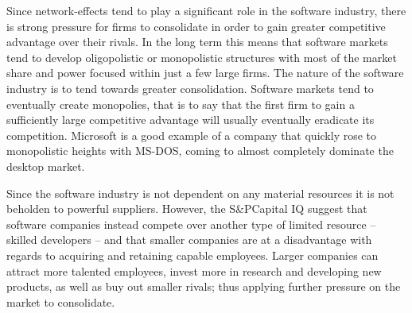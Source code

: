 Since network-effects tend to play a significant role in the software industry, there is strong pressure for firms to consolidate in order to gain greater competitive advantage over their rivals.\autocite[422]{schief2013mergers}
In the long term this means that software markets tend to develop oligopolistic or monopolistic structures with most of the market share and power focused within just a few large firms.\autocite[422]{schief2013mergers}
The nature of the software industry is to tend towards greater consolidation.\autocite[]{LargeParadigmShiftCloudComputing}
Software markets tend to eventually create monopolies, that is to say that the first firm to gain a sufficiently large competitive advantage will usually eventually eradicate its competition.\autocite[4]{buxmann2012software}
Microsoft is a good example of a company that quickly rose to monopolistic heights with MS-DOS, coming to almost completely dominate the desktop market.\autocite[4]{buxmann2012software}

Since the software industry is not dependent on any material resources it is not beholden to powerful suppliers.
However, the S\&PCapital IQ suggest that software companies instead compete over another type of limited resource -- skilled developers -- and that smaller companies are at a disadvantage with regards to acquiring and retaining capable employees.\autocite[39]{SurveysSoftware2015}
Larger companies can attract more talented employees, invest more in research and developing new products, as well as buy out smaller rivals; thus applying further pressure on the market to consolidate.\autocite[34]{IndustrySurveysInternet}

